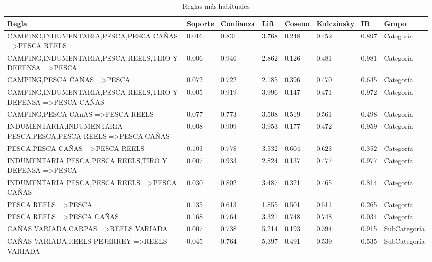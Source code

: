 \documentclass[]{article}
\begin{document}
	\begin{landscape}
		\begin{table}[htbp]
			\centering
			\caption{Reglas más habituales}
			\renewcommand{\arraystretch}{1.2}
			\addtolength{\tabcolsep}{-1.5pt}
			\begin{tabular}{llllllll}
				\textbf{Regla} & \textbf{Soporte} & \textbf{Confianza} & \textbf{Lift} & \textbf{Coseno} & \textbf{Kulczinsky} & \textbf{IR} & \textbf{Grupo} \\
				\hline 		
				{CAMPING,INDUMENTARIA,PESCA,PESCA CAÑAS} =\textgreater {PESCA REELS} & 0.016 & 0.831 & 3.768 & 0.248 & 0.452 & 0.897 & Categoría \\
				{CAMPING,INDUMENTARIA,PESCA REELS,TIRO Y DEFENSA} =\textgreater {PESCA} & 0.006 & 0.946 & 2.862 & 0.126 & 0.481 & 0.981 & Categoría \\
				{CAMPING,PESCA CAÑAS} =\textgreater {PESCA} & 0.072 & 0.722 & 2.185 & 0.396 & 0.470 & 0.645 & Categoría \\
				{CAMPING,INDUMENTARIA,PESCA REELS,TIRO Y DEFENSA} =\textgreater {PESCA CAÑAS} & 0.005 & 0.919 & 3.996 & 0.147 & 0.471 & 0.972 & Categoría \\
				{CAMPING,PESCA CAnAS} =\textgreater {PESCA REELS} & 0.077 & 0.773 & 3.508 & 0.519 & 0.561 & 0.498 & Categoría \\
				{INDUMENTARIA,INDUMENTARIA PESCA,PESCA,PESCA REELS} =\textgreater {PESCA CAÑAS} & 0.008 & 0.909 & 3.953 & 0.177 & 0.472 & 0.959 & Categoría \\
				{PESCA,PESCA CAÑAS} =\textgreater {PESCA REELS} & 0.103 & 0.778 & 3.532 & 0.604 & 0.623 & 0.352 & Categoría \\
				{INDUMENTARIA PESCA,PESCA REELS,TIRO Y DEFENSA} =\textgreater {PESCA} & 0.007 & 0.933 & 2.824 & 0.137 & 0.477 & 0.977 & Categoría \\
				{INDUMENTARIA PESCA,PESCA REELS} =\textgreater {PESCA CAÑAS} & 0.030 & 0.802 & 3.487 & 0.321 & 0.465 & 0.814 & Categoría \\
				{PESCA REELS} =\textgreater {PESCA} & 0.135 & 0.613 & 1.855 & 0.501 & 0.511 & 0.265 & Categoría \\
				{PESCA REELS} =\textgreater {PESCA CAÑAS} & 0.168 & 0.764 & 3.321 & 0.748 & 0.748 & 0.034 & Categoría \\
				{CAÑAS VARIADA,CARPAS} =\textgreater {REELS VARIADA} & 0.007 & 0.738 & 5.214 & 0.193 & 0.394 & 0.915 & SubCategoría \\
				{CAÑAS VARIADA,REELS PEJERREY} =\textgreater {REELS VARIADA} & 0.045 & 0.764 & 5.397 & 0.491 & 0.539 & 0.535 & SubCategoría \\

\end{tabular}
\end{table}
\end{landscape}
\end{document}
